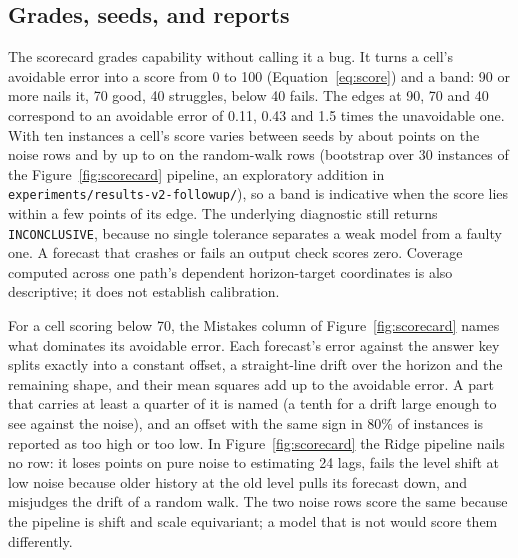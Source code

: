 \documentclass[11pt,a4paper]{article}
\newcommand{\code}[1]{\texttt{#1}}
\begin{document}
\subsection{Grades, seeds, and reports}
\label{sec:grades}

The scorecard grades capability without calling it a bug. It turns a
cell's avoidable error into a score from 0 to 100
(Equation~\eqref{eq:score}) and a band: 90 or more nails it, 70 good, 40
struggles, below 40 fails. The edges at 90, 70 and 40 correspond to an
avoidable error of 0.11, 0.43 and 1.5 times the unavoidable one. With ten
instances a cell's score varies between seeds by about
\ScorecardNoiseSD{} points on the noise rows and by up to
\ScorecardMaxSD{} on the random-walk rows (bootstrap over 30 instances of
the Figure~\ref{fig:scorecard} pipeline, an exploratory addition in
\code{experiments/results-v2-followup/}), so a band is indicative when the
score lies within a few points of its edge. The
underlying diagnostic still returns \code{INCONCLUSIVE}, because no
single tolerance separates a weak model from a faulty one. A forecast
that crashes or fails an output check scores zero.
Coverage computed across one path's dependent horizon-target coordinates
is also descriptive; it does not establish calibration.

For a cell scoring below 70, the Mistakes column of
Figure~\ref{fig:scorecard} names what dominates its avoidable error. Each
forecast's error against the answer key splits exactly into a constant
offset, a straight-line drift over the horizon and the remaining shape,
and their mean squares add up to the avoidable error. A part that carries
at least a quarter of it is named (a tenth for a drift large enough to see
against the noise), and an offset with the same sign in 80\% of instances
is reported as too high or too low. In Figure~\ref{fig:scorecard} the
Ridge pipeline nails no row: it loses \ScorecardNoiseLoss{} points on pure
noise to estimating 24 lags, fails the level shift at low noise because
older history at the old level pulls its forecast down, and misjudges the
drift of a random walk. The two noise rows score the same because the
pipeline is shift and scale equivariant; a model that is not would score
them differently.
\end{document}

